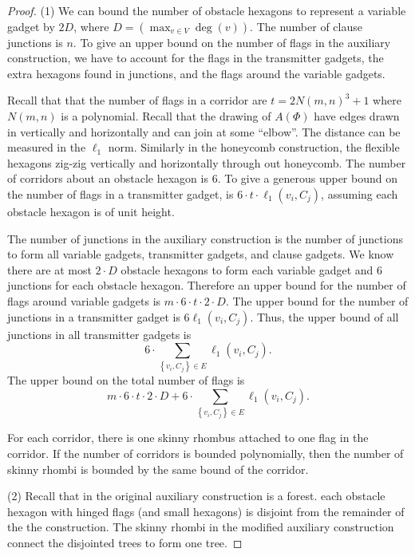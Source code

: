 \documentclass[10pt]{CSUNthesis}
\theoremstyle{plain}%
\theoremstyle{definition}
\theoremstyle{remark}
\newcommand{\lr}[1]{\left( #1 \right)}
\begin{document}
\begin{proof}
\noindent (1) We can bound the number of obstacle hexagons to represent a variable gadget by $2 D$, where $D = \lr{ \max_{v \in V} \deg (v)}$.  
The number of clause junctions is $n$.
To give an upper bound on the number of flags in the auxiliary construction, we have to account for the flags in the transmitter gadgets, the extra hexagons found in junctions, and the flags around the variable gadgets.

Recall that that the number of flags in a corridor are $ t = 2N(m,n)^3 + 1 $ where $N(m,n)$ is a polynomial. 
Recall that the drawing of $A(\Phi)$ have edges drawn in vertically and horizontally and can join at some ``elbow''.  
The distance can be measured in the $\ell_1$ norm.
Similarly in the honeycomb construction, the flexible hexagons zig-zig vertically and horizontally through out honeycomb.  
The number of corridors about an obstacle hexagon is $6$.
To give a generous upper bound on the number of flags in a transmitter gadget, is $6 \cdot t \cdot \ell_1\lr{v_i,C_j}$, assuming each obstacle hexagon is of unit height.

The number of junctions in the auxiliary construction is the number of junctions to form all variable gadgets, transmitter gadgets, and clause gadgets. 
We know there are at most $2 \cdot D$ obstacle hexagons to form each variable gadget and $6$ junctions for each obstacle hexagon.  
Therefore an upper bound for the number of flags around variable gadgets is $m \cdot 6 \cdot t \cdot 2 \cdot D$.
The upper bound for the number of junctions in a transmitter gadget is $6 \ell_1 \lr{v_i, C_j}$.  
Thus, the upper bound of all junctions in all transmitter gadgets is $$6 \cdot \sum_{\left\lbrace v_i, C_j \right\rbrace \in E} \ell_1 \lr{v_i, C_j}.$$
The upper bound on the total number of flags is
$$m \cdot 6 \cdot t \cdot 2 \cdot D + 6 \cdot \sum_{\left\lbrace v_i, C_j \right\rbrace \in E} \ell_1 \lr{v_i, C_j}.$$

For each corridor, there is one skinny rhombus attached to one flag in the corridor.  If the number of corridors is bounded polynomially, then the number of skinny rhombi is bounded by the same bound of the corridor.

\noindent (2) Recall that in the original auxiliary construction is a forest.
each obstacle hexagon with hinged flags (and small hexagons) is disjoint from the remainder of the the construction. 
The skinny rhombi in the modified auxiliary construction connect the disjointed trees to form one tree.


\end{proof}
\end{document}
